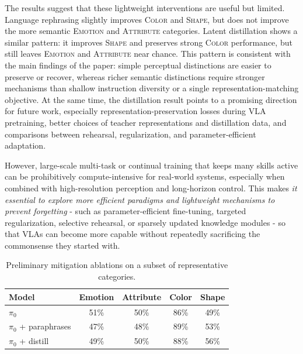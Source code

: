 \documentclass{llmxive}
\providecommand{\heatG}[1]{\cellcolor{mygreen}#1}
\providecommand{\heatLG}[1]{\cellcolor{mylightgreen}#1}
\providecommand{\heatO}[1]{\cellcolor{myorange}#1}
\providecommand{\arraystretch}{0.95}
\begin{document}
The results suggest that these lightweight interventions are useful but limited.
Language rephrasing slightly improves \textsc{Color} and \textsc{Shape}, but does not improve the more semantic \textsc{Emotion} and \textsc{Attribute} categories.
Latent distillation shows a similar pattern: it improves \textsc{Shape} and preserves strong \textsc{Color} performance, but still leaves \textsc{Emotion} and \textsc{Attribute} near chance.
This pattern is consistent with the main findings of the paper: simple perceptual distinctions are easier to preserve or recover, whereas richer semantic distinctions require stronger mechanisms than shallow instruction diversity or a single representation-matching objective.
At the same time, the distillation result points to a promising direction for future work, especially representation-preservation losses during VLA pretraining, better choices of teacher representations and distillation data, and comparisons between rehearsal, regularization, and parameter-efficient adaptation.

However, large-scale multi-task or continual training that keeps many skills active can be prohibitively compute-intensive for real-world systems, especially when combined with high-resolution perception and long-horizon control.
This makes \textit{it essential to explore more efficient paradigms and lightweight mechanisms to prevent forgetting} - such as parameter-efficient fine-tuning, targeted regularization, selective rehearsal, or sparsely updated knowledge modules - so that VLAs can become more capable without repeatedly sacrificing the commonsense they started with.

\begin{table}[t]
\centering
\footnotesize
\setlength{\tabcolsep}{3pt}
\renewcommand{\arraystretch}{0.95}
\begin{tabular}{lcccc}
\toprule
\textbf{Model}
& \textbf{Emotion}
& \textbf{Attribute}
& \textbf{Color}
& \textbf{Shape} \\
\midrule

$\pi_0$
& \heatO{51\%} & \heatO{50\%} & \heatG{86\%} & \heatO{49\%} \\
$\pi_0$ + paraphrases
& \heatO{47\%} & \heatO{48\%} & \heatG{89\%} & \heatO{53\%} \\
$\pi_0$ + distill
& \heatO{49\%} & \heatO{50\%} & \heatG{88\%} & \heatLG{56\%} \\

\bottomrule
\end{tabular}
\caption{Preliminary mitigation ablations on a subset of representative categories.}
\label{tab:appendix_mitigation_ablation}
\end{table}
\end{document}
